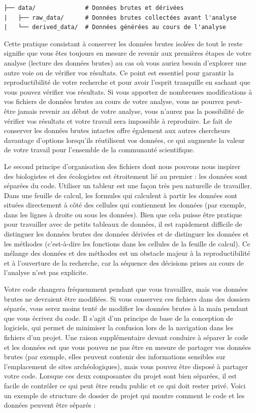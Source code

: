 \documentclass[
  french,
]{scrbook}
\begin{document}
\begin{verbatim}
├── data/              # Données brutes et dérivées
|   ├── raw_data/      # Données brutes collectées avant l'analyse
|   └── derived_data/  # Données générées au cours de l'analyse
\end{verbatim}

Cette pratique consistant à conserver les données brutes isolées de tout le reste signifie que vous êtes toujours en mesure de revenir aux premières étapes de votre analyse (lecture des données brutes) au cas où vous auriez besoin d'explorer une autre voie ou de vérifier vos résultats. Ce point est essentiel pour garantir la reproductibilité de votre recherche et pour avoir l'esprit tranquille en sachant que vous pouvez vérifier vos résultats. Si vous apportez de nombreuses modifications à vos fichiers de données brutes au cours de votre analyse, vous ne pourrez peut-être jamais revenir au début de votre analyse, vous n'aurez pas la possibilité de vérifier vos résultats et votre travail sera impossible à reproduire. Le fait de conserver les données brutes intactes offre également aux autres chercheurs davantage d'options lorsqu'ils réutilisent vos données, ce qui augmente la valeur de votre travail pour l'ensemble de la communauté scientifique.

Le second principe d'organisation des fichiers dont nous pouvons nous inspirer des biologistes et des écologistes est étroitement lié au premier : les données sont séparées du code. Utiliser un tableur est une façon très peu naturelle de travailler. Dans une feuille de calcul, les formules qui calculent à partir les données sont situées directement à côté des cellules qui contiennent les données (par exemple, dans les lignes à droite ou sous les données). Bien que cela puisse être pratique pour travailler avec de petits tableaux de données, il est rapidement difficile de distinguer les données brutes des données dérivées et de distinguer les données et les méthodes (c'est-à-dire les fonctions dans les cellules de la feuille de calcul). Ce mélange des données et des méthodes est un obstacle majeur à la reproductibilité et à l'ouverture de la recherche, car la séquence des décisions prises au cours de l'analyse n'est pas explicite.

Votre code changera fréquemment pendant que vous travaillez, mais vos données brutes ne devraient être modifiées. Si vous conservez ces fichiers dans des dossiers séparés, vous serez moins tenté de modifier les données brutes à la main pendant que vous écrivez du code. Il s'agit d'un principe de base de la conception de logiciels, qui permet de minimiser la confusion lors de la navigation dans les fichiers d'un projet. Une raison supplémentaire devant conduire à séparer le code et les données est que vous pouvez ne pas être en mesure de partager vos données brutes (par exemple, elles peuvent contenir des informations sensibles sur l'emplacement de sites archéologiques), mais vous pouvez être disposé à partager votre code. Lorsque ces deux composantes du projet sont bien séparées, il est facile de contrôler ce qui peut être rendu public et ce qui doit rester privé. Voici un exemple de structure de dossier de projet qui montre comment le code et les données peuvent être séparés :
\end{document}
